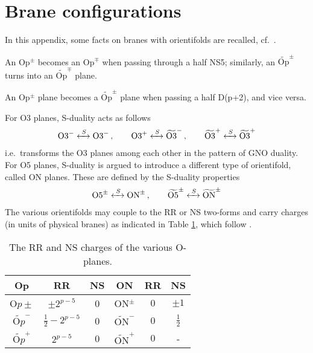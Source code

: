 \documentclass[a4paper,11pt]{article}
\begin{document}
\section{Brane configurations}
\label{app:branes}
In this appendix, some facts on branes with orientifolds are recalled, cf.\ \cite{Evans:1997hk,Hanany:1999sj,Hanany:2000fq}. 
\begin{compactitem}
\item An Op${}^\pm$ becomes an Op${}^\mp$ when passing through a half NS5; similarly, an $\widetilde{\mathrm{Op}}^{\pm}$ turns into an $\widetilde{\mathrm{Op}}^{\mp}$ plane.
\item An Op${}^{\pm}$ plane becomes a $\widetilde{\mathrm{Op}}^{\pm}$ plane when passing a half D(p+2), and vice versa.
\end{compactitem}

For O3 planes, S-duality acts as follows
\begin{align}
\mathrm{O3}^- \xleftrightarrow{\; S \;} \mathrm{O3}^- 
\, , \qquad 
\mathrm{O3}^+ \xleftrightarrow{\; S \;} \widetilde{\mathrm{O3}}^-
\, , \qquad
\widetilde{\mathrm{O3}}^+ \xleftrightarrow{\; S \;} \widetilde{\mathrm{O3}}^+
\end{align}
i.e.\ transforms the O3 planes among each other in the pattern of GNO duality.
% 
For O5 planes, S-duality is argued to introduce a different type of orientifold, called ON planes. These are defined by the S-duality properties
\begin{align}
\mathrm{O5}^\pm \xleftrightarrow{\; S \;} \mathrm{ON}^\pm    
\, ,\qquad 
\widetilde{\mathrm{O5}}^\pm \xleftrightarrow{\; S \;} \widetilde{\mathrm{ON}}^\pm  
\end{align}
The various orientifolds may couple to the RR or NS two-forms and carry charges (in units of physical branes) as indicated in Table \ref{tab:O-plane_charges}, which follow \cite{Hanany:1999sj,Feng:2000eq}.

\begin{table}[t]
\centering
\begin{tabular}{c|cc||c|cc}
\toprule 
Op &     RR  &  NS   &  ON &   RR  &  NS  \\ \midrule
O$p\pm$  & $\pm2^{p-5}$   & 0  & ON${}^\pm$  & $0$   & $\pm 1$\\
$\widetilde{\text{O$p$}}^-$  & $\frac{1}{2}-2^{p-5}$   & 0 & $\widetilde{\mathrm{ON}}^-$  & $0$   & $\frac{1}{2}$\\
$\widetilde{\text{O$p$}}^+$  & $2^{p-5}$   & 0 & $\widetilde{\mathrm{ON}}^+$  & $0$   & -\\ \bottomrule
\end{tabular}
\caption{The RR and NS charges of the various O-planes.}
\label{tab:O-plane_charges}
\end{table}
\end{document}
